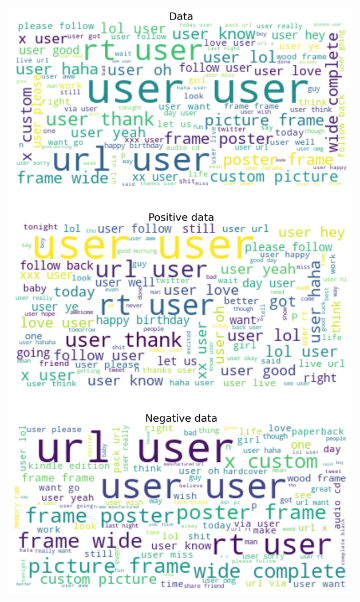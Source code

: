 \documentclass{article}
\begin{document}
\begin{itemize}
\begin{figure}[H]
\begin{subfigure}[b]{0.24\textwidth}
      \includegraphics[width=\textwidth]{chapter-06/section-01-01/04/visualization/3/wordcloud.png}
    \end{subfigure}
    \begin{subfigure}[b]{0.24\textwidth}
      \centering

\end{subfigure}
\end{figure}
\end{itemize}
\end{document}
